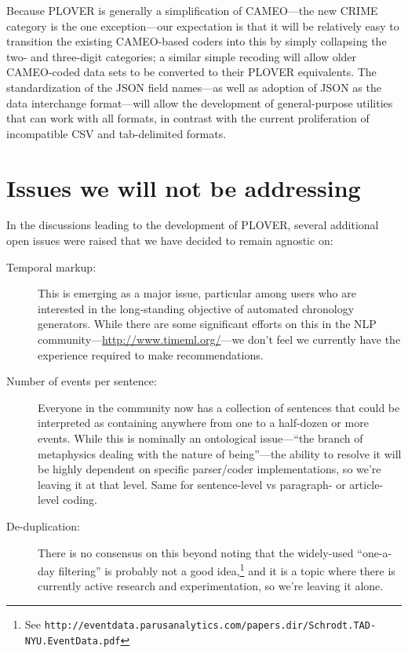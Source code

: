 \documentclass[11pt]{report}
\newcommand{\fn}[1]{\footnote{#1}}
\begin{document}
Because PLOVER is generally a simplification of CAMEO---the new \textsf{CRIME} category is the one exception---our expectation is that it will be relatively easy to transition the existing CAMEO-based coders into this by simply collapsing the two- and three-digit categories; a similar simple recoding will allow older CAMEO-coded data sets to be converted to their PLOVER equivalents. The standardization of the JSON field names---as well as adoption of JSON as the data interchange format---will allow the development of general-purpose utilities that can work with all formats, in contrast with the current proliferation of incompatible CSV and tab-delimited formats.

\section{Issues we will not be addressing}\label{sec:nothing}

In the discussions leading to the development of PLOVER, several additional open issues were raised that we have decided to remain agnostic on:

\begin{description}
\item[Temporal markup:] This is emerging as a major issue, particular among users who are interested in the long-standing objective of automated chronology generators. While there are some significant efforts on this in the NLP community---\url{http://www.timeml.org/}---we don't feel we currently have the experience required to make recommendations.
\item[Number of events per sentence:] Everyone in the community now has a collection of sentences that could be interpreted as containing anywhere from one to a half-dozen or more events. While this is nominally an ontological issue---``the branch of metaphysics dealing with the nature of being''---the ability to resolve it will be highly dependent on specific parser/coder implementations, so we're leaving it at that level. Same for sentence-level vs paragraph- or article-level coding.
\item[De-duplication:] There is no consensus on this beyond noting that the widely-used ``one-a-day filtering'' is probably not a good idea,\fn{See \texttt{http://eventdata.parusanalytics.com/papers.dir/Schrodt.TAD-NYU.EventData.pdf}} and it is a topic where there is currently active research and experimentation, so we're leaving it alone.
\end{description}
\end{document}
